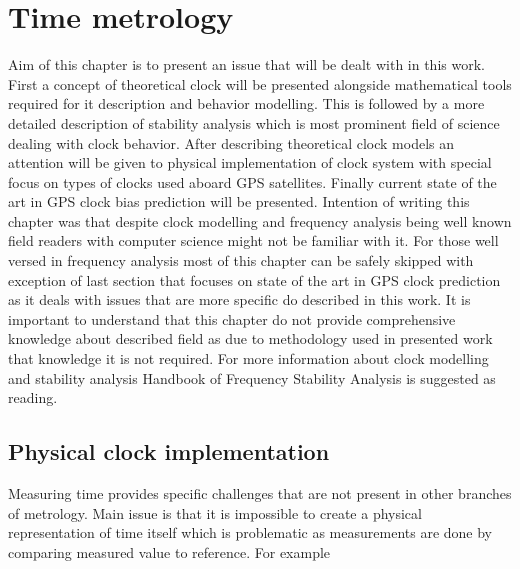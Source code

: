 \chapter{Time metrology}
Aim of this chapter is to present an issue that will be dealt with in this work.
First a concept of theoretical clock will be presented alongside mathematical tools required
for it description and behavior modelling.
This is followed by a more detailed description of stability analysis which is most prominent
field of science dealing with clock behavior.
After describing theoretical clock models an attention will be given to physical implementation
of clock system with special focus on types of clocks used aboard GPS satellites.
Finally current state of the art in GPS clock bias prediction will be presented.
Intention of writing this chapter was that despite clock modelling and frequency analysis being
well known field readers with computer science might not be familiar with it.
For those well versed in frequency analysis most of this chapter can be safely skipped with 
exception of last section that focuses on state of the art in GPS clock prediction as it 
deals with issues that are more specific do described in this work.
It is important to understand that this chapter do not provide comprehensive knowledge about
described field as due to methodology used in presented work that knowledge it is not required.
For more information about clock modelling and stability analysis Handbook of Frequency Stability
Analysis is suggested as reading.


\section{Physical clock implementation}
\label{sec:physical_clock}
\FloatBarrier
Measuring time provides specific challenges that are not present in other branches of 
metrology. Main issue is that it is impossible to create a physical representation of time 
itself which is problematic as measurements are done by comparing measured value to reference.
For example


